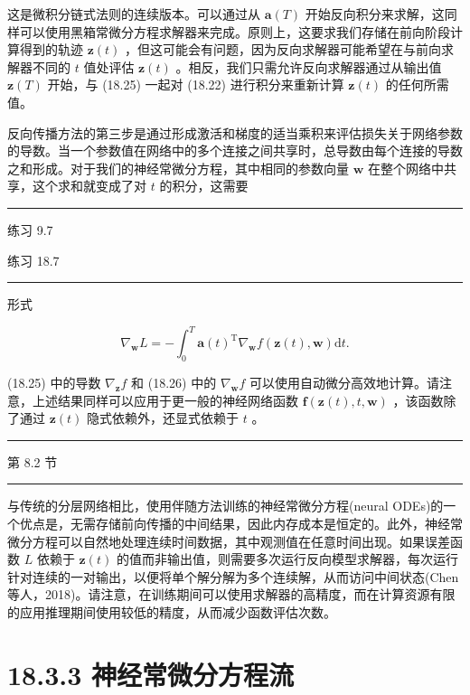 \documentclass[10pt]{article}
\newcommand{\HRule}{\begin{center}\rule{0.9\linewidth}{0.2mm}\end{center}}
\begin{document}
这是微积分链式法则的连续版本。可以通过从 \(\mathbf{a}\left( T\right)\) 开始反向积分来求解，这同样可以使用黑箱常微分方程求解器来完成。原则上，这要求我们存储在前向阶段计算得到的轨迹 \(\mathbf{z}\left( t\right)\) ，但这可能会有问题，因为反向求解器可能希望在与前向求解器不同的 \(t\) 值处评估 \(\mathbf{z}\left( t\right)\) 。相反，我们只需允许反向求解器通过从输出值 \(\mathbf{z}\left( T\right)\) 开始，与 (18.25) 一起对 (18.22) 进行积分来重新计算 \(\mathbf{z}\left( t\right)\) 的任何所需值。

反向传播方法的第三步是通过形成激活和梯度的适当乘积来评估损失关于网络参数的导数。当一个参数值在网络中的多个连接之间共享时，总导数由每个连接的导数之和形成。对于我们的神经常微分方程，其中相同的参数向量 \(\mathbf{w}\) 在整个网络中共享，这个求和就变成了对 \(t\) 的积分，这需要

\HRule

练习 9.7

练习 18.7

\HRule

形式

\[
{\nabla }_{\mathbf{w}}L =  - {\int }_{0}^{T}\mathbf{a}{\left( t\right) }^{\mathrm{T}}{\nabla }_{\mathbf{w}}f\left( {\mathbf{z}\left( t\right) ,\mathbf{w}}\right) \mathrm{d}t. \tag{18.26}
\]

(18.25) 中的导数 \({\nabla }_{\mathbf{z}}f\) 和 (18.26) 中的 \({\nabla }_{\mathbf{w}}f\) 可以使用自动微分高效地计算。请注意，上述结果同样可以应用于更一般的神经网络函数 \(\mathbf{f}\left( {\mathbf{z}\left( t\right) ,t,\mathbf{w}}\right)\) ，该函数除了通过 \(\mathbf{z}\left( t\right)\) 隐式依赖外，还显式依赖于 \(t\) 。

\HRule

第 8.2 节

\HRule

与传统的分层网络相比，使用伴随方法训练的神经常微分方程(neural ODEs)的一个优点是，无需存储前向传播的中间结果，因此内存成本是恒定的。此外，神经常微分方程可以自然地处理连续时间数据，其中观测值在任意时间出现。如果误差函数 \(L\) 依赖于 \(\mathbf{z}\left( t\right)\) 的值而非输出值，则需要多次运行反向模型求解器，每次运行针对连续的一对输出，以便将单个解分解为多个连续解，从而访问中间状态(Chen 等人，2018)。请注意，在训练期间可以使用求解器的高精度，而在计算资源有限的应用推理期间使用较低的精度，从而减少函数评估次数。

\section*{18.3.3 神经常微分方程流}
\end{document}
